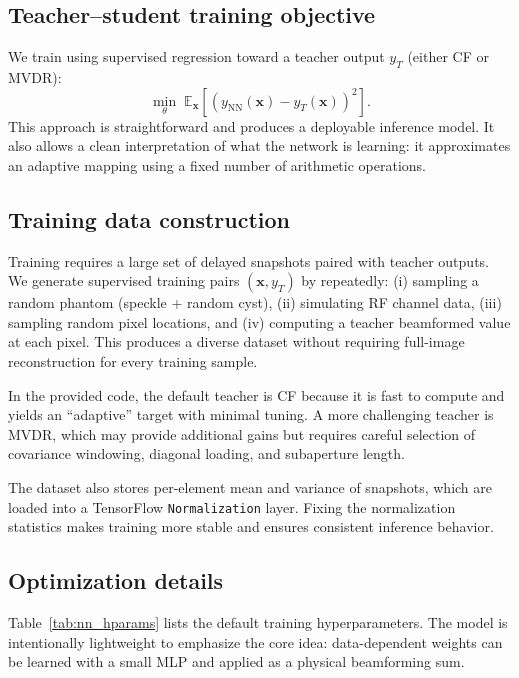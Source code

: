 \documentclass[conference]{IEEEtran}
\begin{document}
\subsection{Teacher--student training objective}
We train using supervised regression toward a teacher output $y_T$ (either CF or MVDR):
\begin{equation}
\min_\theta\; \mathbb{E}_{\mathbf{x}}\left[\left(y_{\mathrm{NN}}(\mathbf{x}) - y_T(\mathbf{x})\right)^2\right].
\end{equation}
This approach is straightforward and produces a deployable inference model. It also allows a clean interpretation of what the network is learning: it approximates an adaptive mapping using a fixed number of arithmetic operations.

\subsection{Training data construction}
Training requires a large set of delayed snapshots paired with teacher outputs.
We generate supervised training pairs $(\mathbf{x},y_T)$ by repeatedly:
(i) sampling a random phantom (speckle + random cyst), (ii) simulating RF channel data, (iii) sampling random pixel locations, and (iv) computing a teacher beamformed value at each pixel.
This produces a diverse dataset without requiring full-image reconstruction for every training sample.

In the provided code, the default teacher is CF because it is fast to compute and yields an ``adaptive'' target with minimal tuning. A more challenging teacher is MVDR, which may provide additional gains but requires careful selection of covariance windowing, diagonal loading, and subaperture length.

The dataset also stores per-element mean and variance of snapshots, which are loaded into a TensorFlow \texttt{Normalization} layer. Fixing the normalization statistics makes training more stable and ensures consistent inference behavior.

\subsection{Optimization details}
Table~\ref{tab:nn_hparams} lists the default training hyperparameters. The model is intentionally lightweight to emphasize the core idea: data-dependent weights can be learned with a small MLP and applied as a physical beamforming sum.
\end{document}
